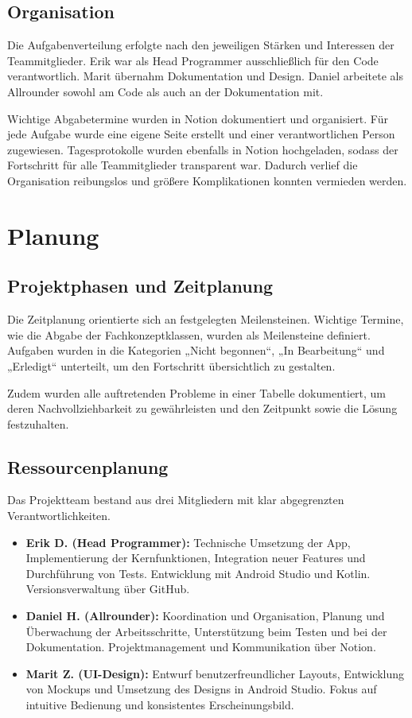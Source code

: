 \documentclass[12pt,a4paper]{article}
\begin{document}
\subsection{Organisation}
Die Aufgabenverteilung erfolgte nach den jeweiligen Stärken und Interessen der Teammitglieder. Erik war als Head Programmer ausschließlich für den Code verantwortlich. Marit übernahm Dokumentation und Design. Daniel arbeitete als Allrounder sowohl am Code als auch an der Dokumentation mit.

Wichtige Abgabetermine wurden in Notion dokumentiert und organisiert. Für jede Aufgabe wurde eine eigene Seite erstellt und einer verantwortlichen Person zugewiesen. Tagesprotokolle wurden ebenfalls in Notion hochgeladen, sodass der Fortschritt für alle Teammitglieder transparent war. Dadurch verlief die Organisation reibungslos und größere Komplikationen konnten vermieden werden.

\section{Planung}

\subsection{Projektphasen und Zeitplanung}
Die Zeitplanung orientierte sich an festgelegten Meilensteinen. Wichtige Termine, wie die Abgabe der Fachkonzeptklassen, wurden als Meilensteine definiert. Aufgaben wurden in die Kategorien „Nicht begonnen“, „In Bearbeitung“ und „Erledigt“ unterteilt, um den Fortschritt übersichtlich zu gestalten.

Zudem wurden alle auftretenden Probleme in einer Tabelle dokumentiert, um deren Nachvollziehbarkeit zu gewährleisten und den Zeitpunkt sowie die Lösung festzuhalten.

\subsection{Ressourcenplanung}
Das Projektteam bestand aus drei Mitgliedern mit klar abgegrenzten Verantwortlichkeiten.

\begin{itemize}
    \item \textbf{Erik D. (Head Programmer):} Technische Umsetzung der App, Implementierung der Kernfunktionen, Integration neuer Features und Durchführung von Tests. Entwicklung mit Android Studio und Kotlin. Versionsverwaltung über GitHub.
    \item \textbf{Daniel H. (Allrounder):} Koordination und Organisation, Planung und Überwachung der Arbeitsschritte, Unterstützung beim Testen und bei der Dokumentation. Projektmanagement und Kommunikation über Notion.
    \item \textbf{Marit Z. (UI-Design):} Entwurf benutzerfreundlicher Layouts, Entwicklung von Mockups und Umsetzung des Designs in Android Studio. Fokus auf intuitive Bedienung und konsistentes Erscheinungsbild.
\end{itemize}
\end{document}
